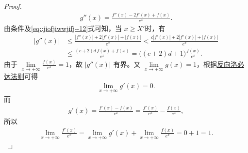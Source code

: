 \documentclass[../../main.tex]{subfiles}%
\begin{document}
\begin{proof}
\begin{align*}
g''(x)=\frac{f''(x)-2f'(x)+f(x)}{e^x}.
\end{align*}
由条件及\eqref{eq::jiofjiwwjifj--12}式可知，当 $x\geqslant X'$时，有
\begin{align*}
|g''(x)| &\leqslant \frac{|f''(x)|+2|f'(x)|+|f(x)|}{e^x} < \frac{c|f'(x)|+2|f'(x)|+|f(x)|}{e^x} \\
&\leqslant \frac{(c+2)d\,f(x)+f(x)}{e^x} = \bigl((c+2)d+1\bigr)\frac{f(x)}{e^x}.
\end{align*}
由于 $\lim\limits_{x\to+\infty}\frac{f(x)}{e^x}=1$，故 $|g''(x)|$ 有界。又 $\lim\limits_{x\to+\infty} g(x)=1$，根据\hyperref[theorem:反向洛必达法则]{反向洛必达法则}可得
\begin{align*}
\lim\limits_{x\to+\infty} g'(x)=0.
\end{align*}
而
\begin{align*}
g'(x)=\frac{f'(x)-f(x)}{e^x}=\frac{f'(x)}{e^x}-\frac{f(x)}{e^x},
\end{align*}
所以
\begin{align*}
\lim\limits_{x\to+\infty}\frac{f'(x)}{e^x}
=\lim\limits_{x\to+\infty}g'(x)+\lim\limits_{x\to+\infty}\frac{f(x)}{e^x}
=0+1=1.
\end{align*}
\end{proof}
\end{document}

